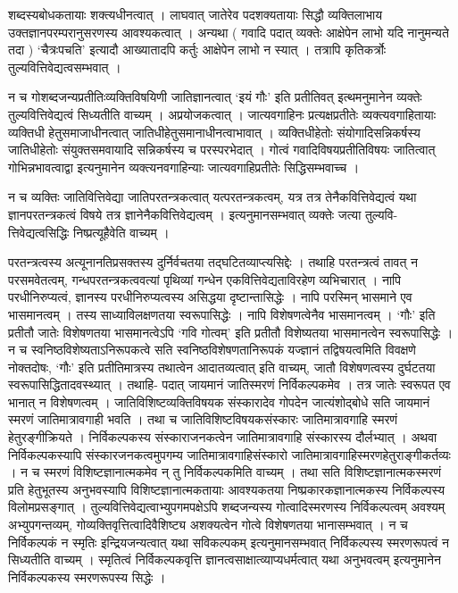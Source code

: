 शब्दस्यबोधकतायाः शक्त्यधीनत्वात् । लाघवात् जातेरेव पदशक्यतायाः सिद्धौ व्यक्तिलाभाय उक्तज्ञानपरम्परानुसरणस्य आवश्यकत्वात् । अन्यथा ( गवादि पदात् व्यक्तेः आक्षेपेन लाभो यदि नानुमन्यते तदा ) ‘चैत्रःपचति’ इत्यादौ आख्यातादपि कर्तुः आक्षेपेन लाभो न स्यात् । तत्रापि कृतिकर्त्रोः तुल्यवित्तिवेद्यत्वसम्भवात् । 

न च गोशब्दजन्यप्रतीतिःव्यक्तिविषयिणी जातिज्ञानत्वात् ‘इयं गौः’ इति प्रतीतिवत् इत्थमनुमानेन व्यक्तेः तुल्यवित्तिवेद्यत्वं सिध्यतीति वाच्यम् । अप्रयोजकत्वात् ।  जात्यवगाहिनः प्रत्यक्षप्रतीतेः व्यक्त्यवगाहितायाः व्यक्तिधी हेतुसमाजाधीनत्वात् जातिधीहेतुसमानाधीनत्वाभावात् । व्यक्तिधीहेतोः संयोगादिसन्निकर्षस्य जातिधीहेतोः संयुक्तसमवायादि सन्निकर्षस्य च परस्परभेदात् । गोत्वं गवादिविषयप्रतीतिविषयः जातित्वात् गोभिन्नभावत्वाद्वा इत्यनुमानेन व्यक्त्यनवगाहिन्याः जात्यवगाहिप्रतीतेः सिद्धिसम्भवाच्च । 

न च व्यक्तिः जातिवित्तिवेद्या जातिपरतन्त्रकत्वात् यत्परतन्त्रकत्वम्, यत्र तत्र तेनैकवित्तिवेद्यत्वं यथा ज्ञानपरतन्त्रकत्वं विषये तत्र ज्ञानेनैकवित्तिवेद्यत्वम् । इत्यनुमानसम्भवात् व्यक्तेः जत्या तुल्यवि- त्तिवेद्यत्वसिद्धिः निष्प्रत्यूहैवेति वाच्यम् ।

परतन्त्रत्वस्य अत्यूनानतिप्रसक्तस्य दुर्निर्वचतया तद्घटितव्याप्त्यसिद्देः । तथाहि परतन्त्रत्वं तावत् न परसमवेतत्वम्, गन्धपरतन्त्रकत्ववत्यां पृथिव्यां गन्धेन एकवित्तिवेद्यताविरहेण व्यभिचारात् । नापि परधीनिरुप्यत्वं, ज्ञानस्य परधीनिरुप्यत्वस्य असिद्धया दृष्टान्तासिद्धेः । नापि परस्मिन् भासमाने एव भासमानत्वम् । तस्य साध्याविलक्षणतया स्वरूपासिद्धेः । नापि विशेषणत्वेनैव भासमानत्वम् । ‘गौः’ इति प्रतीतौ जातेः विशेषणतया भासमानत्वेऽपि ‘गवि गोत्वम्’ इति प्रतीतौ विशेष्यतया भासमानत्वेन स्वरूपासिद्धेः । न च स्वनिष्ठविशेष्यताऽनिरूपकत्वे सति स्वनिष्ठविशेषणतानिरूपकं यज्ज्ञानं तद्विषयत्वमिति विवक्षणे नोक्तदोषः, ‘गौः’ इति प्रतीतिमात्रस्य तथात्वेन आदातव्यत्वात् इति वाच्यम्, जातौ विशेषणत्वस्य दुर्घटतया स्वरूपासिद्धितादवस्थ्यात् । तथाहि- पदात् जायमानं जातिस्मरणं निर्विकल्पकमेव । तत्र जातेः स्वरूपत एव भानात् न विशेषणत्वम् । जातिविशिष्टव्यक्तिविषयक संस्कारादेव गोपदेन जात्यंशोद्बोधे सति जायमानं स्मरणं जातिमात्रावगाही भवति । तथा च जातिविशिष्टविषयकसंस्कारः जातिमात्रावगाहि स्मरणं हेतुरङ्गीक्रियते । निर्विकल्पकस्य संस्काराजनकत्वेन जातिमात्रावगाहि संस्कारस्य दौर्लभ्यात् । अथवा निर्विकल्पकस्यापि संस्कारजनकत्वमुपगम्य जातिमात्रावगाहिसंस्कारो जातिमात्रावगाहिस्मरणहेतुराङ्गीकर्तव्यः । न च स्मरणं विशिष्टज्ञानात्मकमेव न् तु निर्विकल्पकमिति वाच्यम् । तथा सति विशिष्टज्ञानात्मकस्मरणं प्रति हेतुभूतस्य अनुभवस्यापि विशिष्टज्ञानात्मकतायाः आवश्यकतया निष्प्रकारकज्ञानात्मकस्य निर्विकल्पस्य विलोमप्रसङ्गात् । तुल्यवित्तिवेद्यत्वाभ्युपगमपक्षेऽपि शब्दजन्यस्य गोत्वादिस्मरणस्य निर्विकल्पत्वम् अवश्यम् अभ्युपगन्तव्यम्, गोव्यक्तिवृत्तित्वादिवैशिष्ट्य अशक्यत्वेन गोत्वे विशेषणतया भानासम्भवात् । न च निर्विकल्पकं न स्मृतिः इन्द्रियजन्यत्वात् यथा सविकल्पकम् इत्यनुमानसम्भवात् निर्विकल्पस्य स्मरणरूपत्वं न सिध्यतीति वाच्यम् । स्मृतित्वं निर्विकल्पकवृत्ति ज्ञानत्वसाक्षात्व्याप्यधर्मत्वात् यथा अनुभवत्वम् इत्यनुमानेन निर्विकल्पकस्य स्मरणरूपस्य सिद्धेः ।

